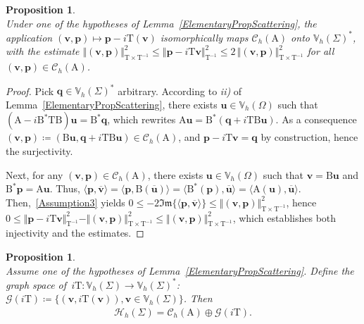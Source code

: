 \documentclass[a4paper,11pt]{article}
\newcommand{\mA}{\mathrm{A}}
\newcommand{\mB}{\mathrm{B}}
\newcommand{\mT}{\mathrm{T}}
\newcommand{\mbV}{\mathbb{V}}
\newcommand{\bp}{\boldsymbol{p}}
\newcommand{\bu}{\boldsymbol{u}}
\newcommand{\bv}{\boldsymbol{v}}
\newcommand{\bq}{\boldsymbol{q}}
\renewcommand{\Im}{\mathfrak{Im}} %
\newtheorem{prop}[defn]{Proposition}
\begin{document}
\begin{prop}\label{IsomorphismCauchyTraces}\quad\\
  Under one of the hypotheses of Lemma~\ref{ElementaryPropScattering}, the application
  $(\bv,\bp)\mapsto \bp-i\mT(\bv)$ isomorphically maps
  $\mathscr{C}_h(\mA)$ onto $\mbV_h(\Sigma)^*$, with the estimate
  $\Vert (\bv,\bp)\Vert_{\mT\times\mT^{-1}}^{2}\leq \Vert
  \bp-i\mT\bv\Vert_{\mT^{-1}}^{2} \leq 2\,\Vert
  (\bv,\bp)\Vert_{\mT\times\mT^{-1}}^{2}$ for all
  $(\bv,\bp)\in \mathscr{C}_h(\mA)$.
\end{prop}
\begin{proof}
Pick $\bq\in \mbV_h(\Sigma)^{*}$ arbitrary. According to
\textit{ii)} of Lemma~\ref{ElementaryPropScattering}, there exists
$\bu\in \mbV_h(\Omega)$ such that $(\mA-i\mB^*\mT \mB)\bu =
\mB^{*}\bq$, which rewrites $\mA\bu = \mB^{*}(\bq+i\mT\mB\bu)$.
As a consequence $(\bv,\bp) \coloneq(\mB\bu, \bq+i\mT\mB\bu)\in
\mathscr{C}_h(\mA)$, and $\bp - i\mT\bv = \bq$ by
construction, hence the surjectivity.

Next, for any $(\bv,\bp)\in \mathscr{C}_h(\mA)$, there exists
$\bu\in \mbV_h(\Omega)$ such that $\bv = \mB\bu$ and $\mB^*\bp =
\mA\bu$. Thus, $\langle \bp,\overline{\bv}\rangle =
\langle\bp,\mB(\overline{\bu})\rangle =
\langle\mB^*(\bp),\overline{\bu}\rangle =
\langle\mA(\bu),\overline{\bu}\rangle$. 
Then,~\eqref{Assumption3} yields $0\leq -2\Im\{\langle
\bp,\overline{\bv}\rangle\}\leq \Vert
(\bv,\bp)\Vert_{\mT\times\mT^{-1}}^{2}$, hence $0\leq \Vert
\bp-i\mT\bv\Vert_{\mT^{-1}}^{2} - \Vert
(\bv,\bp)\Vert_{\mT\times\mT^{-1}}^{2}\leq \Vert
(\bv,\bp)\Vert_{\mT\times\mT^{-1}}^{2}$, which establishes both
injectivity and the estimates. 
\end{proof}

\begin{prop}\label{CauchySetDecomposition}\quad\\
  Assume one of the hypotheses of Lemma~\ref{ElementaryPropScattering}. Define the graph space of \(\,i \mT\colon \mbV_h(\Sigma)\to \mbV_h(\Sigma)^* \): \(\mathscr{G}(i\mT)\coloneq \{(\bv,i\mT(\bv)),\bv \in \mbV_h(\Sigma)\}\). Then
  \begin{align*}
    \mathscr{H}_h(\Sigma) = \mathscr{C}_h(\mA) \oplus \mathscr{G}(i\mT).
  \end{align*}
\end{prop}
\end{document}
